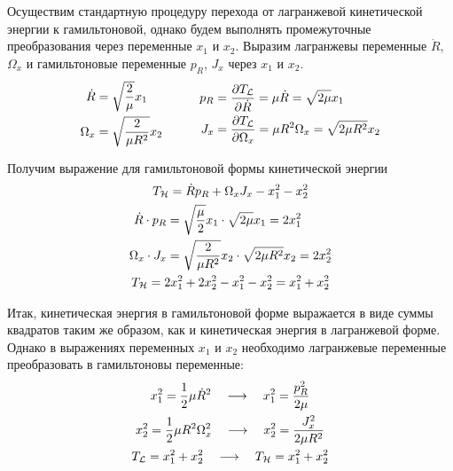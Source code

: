 \documentclass[12pt]{article}
\newcommand{\mL}{\mathcal{L}}
\newcommand{\mH}{\mathcal{H}}
\newcommand{\dR}{\dot{R}}
\begin{document}
Осуществим стандартную процедуру перехода от лагранжевой кинетической энергии к гамильтоновой, однако будем выполнять промежуточные преобразования через переменные $x_1$ и $x_2$. Выразим лагранжевы переменные $\dR$, $\Omega_x$ и гамильтоновые переменные $p_R$, $J_x$ через $x_1$ и $x_2$. 
\begin{gather}
	\begin{aligned}
			\dR &= \sqrt{\frac{2}{\mu}} x_1 \\
			\Omega_x &= \sqrt{\frac{2}{\mu R^2}} x_2 \\
	\end{aligned}
	\quad \quad \quad
	\begin{aligned}
			p_R &= \frac{\partial T_\mL}{\partial \dR} = \mu \dR = \sqrt{2 \mu} x_1 \\
			J_x &= \frac{\partial T_\mL}{\partial \Omega_x} = \mu R^2 \Omega_x = \sqrt{2 \mu R^2} x_2
	\end{aligned} \notag
\end{gather}

Получим выражение для гамильтоновой формы кинетической энергии
\begin{gather}
	T_\mH = \dR p_R + \Omega_x J_x - x_1^2 - x_2^2 \notag \\
	\begin{aligned}
			\dR \cdot p_R &= \sqrt{\frac{\mu}{2}} x_1  \cdot \sqrt{2 \mu} x_1 = 2 x_1^2 \\
			\Omega_x \cdot J_x &= \sqrt{\frac{2}{\mu R^2}} x_2 \cdot \sqrt{2 \mu R^2} x_2 = 2 x_2^2
	\end{aligned} \notag \\
	T_\mH = 2 x_1^2 + 2 x_2^2 - x_1^2 - x_2^2 = x_1^2 + x_2^2 \notag
\end{gather}

Итак, кинетическая энергия в гамильтоновой форме выражается в виде суммы квадратов таким же образом, как и кинетическая энергия в лагранжевой форме. Однако в выражениях переменных $x_1$ и $x_2$ необходимо лагранжевые переменные преобразовать в гамильтоновы переменные:
\begin{gather}
	x_1^2 = \frac{1}{2} \mu \dR^2 \quad \longrightarrow \quad x_1^2 = \frac{p_R^2}{2 \mu} \notag \\
	x_2^2 = \frac{1}{2} \mu R^2 \Omega_x^2 \quad \longrightarrow \quad x_2^2 = \frac{J_x^2}{2 \mu R^2} \notag \\
	T_\mL = x_1^2 + x_2^2 \quad \longrightarrow \quad T_\mH = x_1^2 + x_2^2 \notag
\end{gather}
\end{document}
